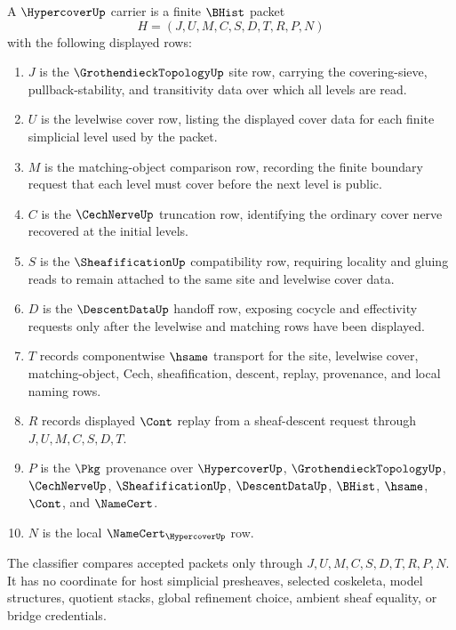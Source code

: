 \begin{definition}
\label{def:hypercover-carrier}
A $\HypercoverUp$ carrier is a finite $\BHist$ packet
$$
H=(J,U,M,C,S,D,T,R,P,N)
$$
with the following displayed rows:
\begin{enumerate}
\item $J$ is the $\GrothendieckTopologyUp$ site row, carrying the covering-sieve, pullback-stability, and transitivity data over which all levels are read.
\item $U$ is the levelwise cover row, listing the displayed cover data for each finite simplicial level used by the packet.
\item $M$ is the matching-object comparison row, recording the finite boundary request that each level must cover before the next level is public.
\item $C$ is the $\CechNerveUp$ truncation row, identifying the ordinary cover nerve recovered at the initial levels.
\item $S$ is the $\SheafificationUp$ compatibility row, requiring locality and gluing reads to remain attached to the same site and levelwise cover data.
\item $D$ is the $\DescentDataUp$ handoff row, exposing cocycle and effectivity requests only after the levelwise and matching rows have been displayed.
\item $T$ records componentwise $\hsame$ transport for the site, levelwise cover, matching-object, Cech, sheafification, descent, replay, provenance, and local naming rows.
\item $R$ records displayed $\Cont$ replay from a sheaf-descent request through $J,U,M,C,S,D,T$.
\item $P$ is the $\Pkg$ provenance over $\HypercoverUp$, $\GrothendieckTopologyUp$, $\CechNerveUp$, $\SheafificationUp$, $\DescentDataUp$, $\BHist$, $\hsame$, $\Cont$, and $\NameCert$.
\item $N$ is the local $\NameCert_{\HypercoverUp}$ row.
\end{enumerate}
The classifier compares accepted packets only through $J,U,M,C,S,D,T,R,P,N$. It has no coordinate for host simplicial presheaves, selected coskeleta, model structures, quotient stacks, global refinement choice, ambient sheaf equality, or bridge credentials.
\end{definition}

